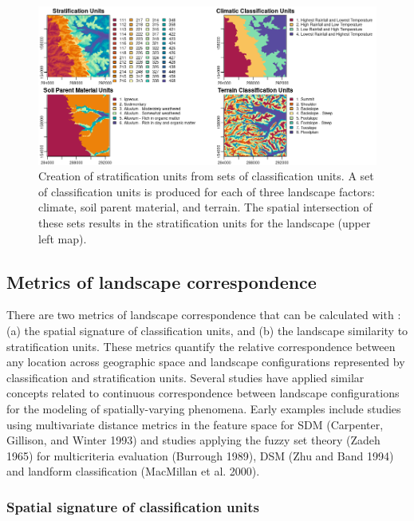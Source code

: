 \begin{figure}[H]

{\centering \includegraphics[width=1\linewidth,height=0.25\textheight]{figures/figure_6} 

}

\caption{Creation of stratification units from sets of classification units. A set of classification units is produced for each of three landscape factors: climate, soil parent material, and terrain. The spatial intersection of these sets results in the stratification units for the landscape (upper left map).}\label{fig:f6}
\end{figure}

\hypertarget{metrics-of-landscape-correspondence}{%
\subsection{Metrics of landscape correspondence}\label{metrics-of-landscape-correspondence}}

There are two metrics of landscape correspondence that can be calculated with
: (a) the spatial signature of classification units, and (b) the
landscape similarity to stratification units. These metrics quantify the
relative correspondence between any location across geographic space and
landscape configurations represented by classification and stratification units.
Several studies have applied similar concepts related to continuous
correspondence between landscape configurations for the modeling of
spatially-varying phenomena. Early examples include studies using multivariate
distance metrics in the feature space for SDM (Carpenter, Gillison, and Winter 1993) and studies
applying the fuzzy set theory (Zadeh 1965) for multicriteria evaluation
(Burrough 1989), DSM (Zhu and Band 1994) and landform classification (MacMillan et al. 2000).

\hypertarget{spatial-signature-of-classification-units}{%
\subsubsection{Spatial signature of classification units}\label{spatial-signature-of-classification-units}}


